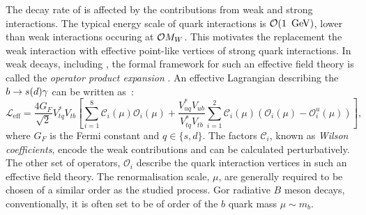 The decay rate of \BtoXsdgamma is affected by the contributions from weak and strong interactions.
The typical energy scale of quark interactions is ${\cal O}(1~\mathrm{\,Ge\kern -0.1em V})$, lower than weak interactions occuring at ${\cal O}{M_W}$.
This motivates the replacement the weak interaction with effective point-like vertices of strong quark interactions.
In weak decays, including \BtoXsdgamma, the formal framework for such an effective field theory is called the \textit{operator product expansion} \cite{Peskin:1995ev,Buchalla:1995vs,Buras:1998raa}. 
An effective Lagrangian describing the $b\rightarrow s(d)\gamma$ can be written as~\cite{Kaminski:2012eb,Misiak:2015xwa}:
\begin{equation}\label{eq:effective_lagrangian}
    \mathcal{L}_{\mathrm{eff}} = \frac{4G_F}{\sqrt{2}}V_{tq}^*V_{tb}\left[\sum^{8}_{i=1}\mathcal{C}_i(\mu)\mathcal{O}_i(\mu)
                                                + \frac{V^*_{uq}V_{ub}}{V^*_{tq}V_{tb}}\sum^{2}_{i=1}\mathcal{C}_i(\mu)(\mathcal{O}_i(\mu)-\mathcal{O}_i^u(\mu))\right],
\end{equation}
where $G_F$ is the Fermi constant and $q\in\{s,d\}$.
The factors $\mathcal{C}_i$, known as \textit{Wilson coefficients}, encode the weak contributions and can be calculated perturbatively.
The other set of operators, $\mathcal{O}_i$ describe the quark interaction vertices in such an effective field theory.
The renormalisation scale, $\mu$, are generally required to be chosen of a similar order as the studied process.
Gor radiative $B$ meson decays, conventionally, it is often set to be of order of the $b$ quark mass $\mu\sim m_b$.

